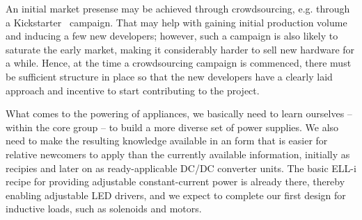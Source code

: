 \documentclass[final]{siamltex}
\begin{document}
An initial market presense may be achieved through crowdsourcing,
e.g. through a Kickstarter~\cite{Kickstarter} campaign.  That may help
with gaining initial production volume and inducing a few new
developers; however, such a campaign is also likely to saturate the
early market, making it considerably harder to sell new hardware for a
while.  Hence, at the time a crowdsourcing campaign is commenced,
there must be sufficient structure in place so that the new developers
have a clearly laid approach and incentive to start contributing to
the project.

What comes to the powering of appliances, we basically need to learn
ourselves -- within the core group -- to build a more diverse set of
power supplies.  We also need to make the resulting knowledge
available in an form that is easier for relative newcomers to apply
than the currently available information, initially as recipies and
later on as ready-applicable DC/DC converter units.  The basic ELL-i
recipe for providing adjustable constant-current power is already
there, thereby enabling adjustable LED drivers, and we expect to
complete our first design for inductive loads, such as solenoids and
motors.
\end{document}
